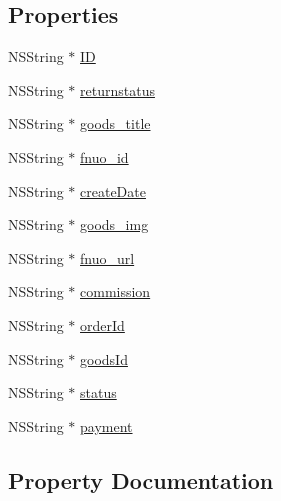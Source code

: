 \subsection*{Properties}
\begin{DoxyCompactItemize}
\item 
N\+S\+String $\ast$ \mbox{\hyperlink{interface_f_n_m_c_a_order_detail_model_abeb1d6e76fe99ca43e1646db9fffd1ac}{ID}}
\item 
N\+S\+String $\ast$ \mbox{\hyperlink{interface_f_n_m_c_a_order_detail_model_a673733acf3f48733484ea44371a139a7}{returnstatus}}
\item 
N\+S\+String $\ast$ \mbox{\hyperlink{interface_f_n_m_c_a_order_detail_model_a466d102008067f60ce6f4665e18a0e91}{goods\+\_\+title}}
\item 
N\+S\+String $\ast$ \mbox{\hyperlink{interface_f_n_m_c_a_order_detail_model_af9cbb23d595e3bbe59e65944d9c6fcf5}{fnuo\+\_\+id}}
\item 
N\+S\+String $\ast$ \mbox{\hyperlink{interface_f_n_m_c_a_order_detail_model_ad9223ecf103b682241c95c2a33a15393}{create\+Date}}
\item 
N\+S\+String $\ast$ \mbox{\hyperlink{interface_f_n_m_c_a_order_detail_model_acdf03c506b26771a1a116ee3ac974f5c}{goods\+\_\+img}}
\item 
N\+S\+String $\ast$ \mbox{\hyperlink{interface_f_n_m_c_a_order_detail_model_a5a211af996efb1ef347b4e694a4a223b}{fnuo\+\_\+url}}
\item 
N\+S\+String $\ast$ \mbox{\hyperlink{interface_f_n_m_c_a_order_detail_model_a141a6765aaf6cd7d07e5edf17a1d04a2}{commission}}
\item 
N\+S\+String $\ast$ \mbox{\hyperlink{interface_f_n_m_c_a_order_detail_model_ad62d4cc71f7bf0108ed690590da0da2b}{order\+Id}}
\item 
N\+S\+String $\ast$ \mbox{\hyperlink{interface_f_n_m_c_a_order_detail_model_a1444b45c97a6497282d2eaefb218833a}{goods\+Id}}
\item 
N\+S\+String $\ast$ \mbox{\hyperlink{interface_f_n_m_c_a_order_detail_model_a54a45c89c40b83e5870329d01dfd002c}{status}}
\item 
N\+S\+String $\ast$ \mbox{\hyperlink{interface_f_n_m_c_a_order_detail_model_a20bca3e1224ba22d6ed65802eb3b53a1}{payment}}
\end{DoxyCompactItemize}


\subsection{Property Documentation}
\mbox{\label{interface_f_n_m_c_a_order_detail_model_a141a6765aaf6cd7d07e5edf17a1d04a2}} 
